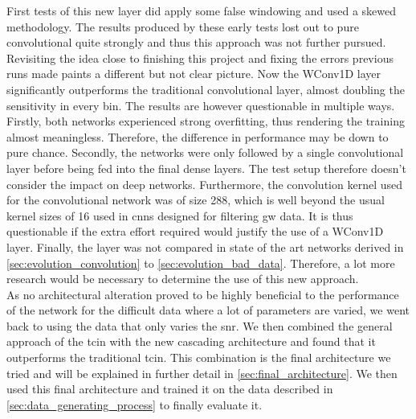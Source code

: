 First tests of this new layer did apply some false windowing and used a skewed methodology. The results produced by these early tests lost out to pure convolutional quite strongly and thus this approach was not further pursued. Revisiting the idea close to finishing this project and fixing the errors previous runs made paints a different but not clear picture. Now the WConv1D layer significantly outperforms the traditional convolutional layer, almost doubling the sensitivity in every bin. The results are however questionable in multiple ways. Firstly, both networks experienced strong overfitting, thus rendering the training almost meaningless. Therefore, the difference in performance may be down to pure chance. Secondly, the networks were only followed by a single convolutional layer before being fed into the final dense layers. The test setup therefore doesn't consider the impact on deep networks. Furthermore, the convolution kernel used for the convolutional network was of size 288, which is well beyond the usual kernel sizes of 16 used in \gls{cnn}s designed for filtering \gls{gw} data. It is thus questionable if the extra effort required would justify the use of a WConv1D layer. Finally, the layer was not compared in state of the art networks derived in \autoref{sec:evolution_convolution} to \autoref{sec:evolution_bad_data}. Therefore, a lot more research would be necessary to determine the use of this new approach.\medskip\\
As no architectural alteration proved to be highly beneficial to the performance of the network for the difficult data where a lot of parameters are varied, we went back to using the data that only varies the \gls{snr}. We then combined the general approach of the \gls{tcin} with the new cascading architecture and found that it outperforms the traditional \gls{tcin}. This combination is the final architecture we tried and will be explained in further detail in \autoref{sec:final_architecture}. We then used this final architecture and trained it on the data described in \autoref{sec:data_generating_process} to finally evaluate it.

